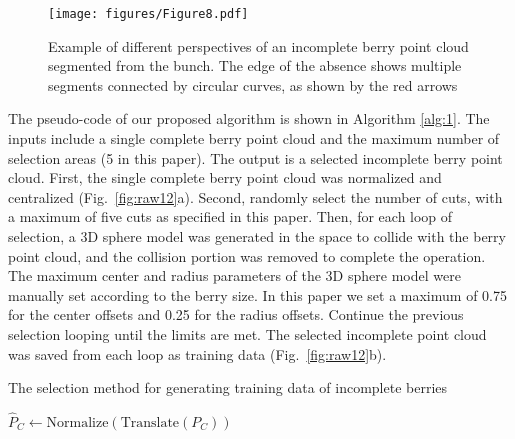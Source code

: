 \documentclass[12pt]{article}
\begin{document}
\begin{figure}[hbt!]
    \centering
    \texttt{[image: figures/Figure8.pdf]}
    \caption{Example of different perspectives of an incomplete berry point cloud segmented from the bunch. The edge of the absence shows multiple segments connected by circular curves, as shown by the red arrows}
    \label{fig:raw4}
\end{figure}

The pseudo-code of our proposed algorithm is shown in Algorithm \ref{alg:1}. 
The inputs include a single complete berry point cloud and the maximum number of selection areas (5 in this paper). 
The output is a selected incomplete berry point cloud. First, the single complete berry point cloud was normalized and centralized (Fig.~\ref{fig:raw12}a). 
Second, randomly select the number of cuts, with a maximum of five cuts as specified in this paper. 
Then, for each loop of selection, a 3D sphere model was generated in the space to collide with the berry point cloud, and the collision portion was removed to complete the operation. 
The maximum center and radius parameters of the 3D sphere model were manually set according to the berry size. 
In this paper we set a maximum of 0.75 for the center offsets and 0.25 for the radius offsets. 
Continue the previous selection looping until the limits are met. The selected incomplete point cloud was saved from each loop as training data (Fig.~\ref{fig:raw12}b). 

\begin{algorithm}
    \caption{The selection method for generating training data of incomplete berries}
    \label{alg:1}
    
    $\hat{P}_C \gets \text{Normalize}(\text{Translate}(P_C))$ 
\end{algorithm}
\end{document}
